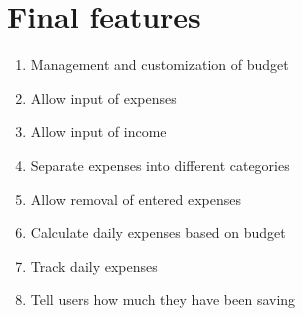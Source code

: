 \section{Final features}
\begin{enumerate}
  \item Management and customization of budget
  \item Allow input of expenses
  \item Allow input of income
  \item Separate expenses into different categories
  \item Allow removal of entered expenses
  \item Calculate daily expenses based on budget
  \item Track daily expenses
  \item Tell users how much they have been saving
\end{enumerate}
